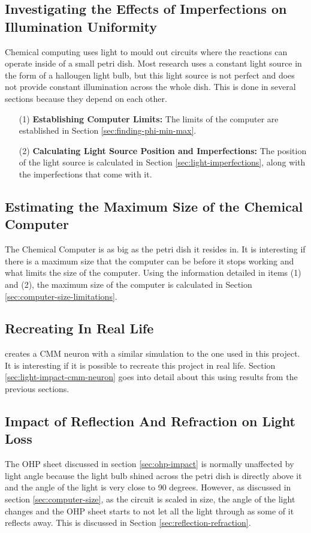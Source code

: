 \subsection{Investigating the Effects of Imperfections on Illumination Uniformity}
Chemical computing uses light to mould out circuits where the reactions can operate inside of a small petri dish. 
Most research  uses a constant light source in the form of a hallougen light bulb, but this light source is not perfect and does not provide constant illumination across the whole dish. 
This is done in several sections because they depend on each other. 
\begin{enumerate}
    \item[(1)] \textbf{Establishing Computer Limits:} The limits of the computer are established in Section \ref{sec:finding-phi-min-max}.
    \item[(2)] \textbf{Calculating Light Source Position and Imperfections:} The position of the light source is calculated in Section \ref{sec:light-imperfections}, along with the imperfections that come with it.
\end{enumerate}

\subsection{Estimating the Maximum Size of the Chemical Computer}
The Chemical Computer is as big as the petri dish it resides in. It is interesting if there is a maximum size that the computer can be before it stops working and 
what limits the size of the computer. 
Using the information detailed in items (1) and (2), the maximum size of the computer is calculated in Section \ref{sec:computer-size-limitations}.

\subsection{Recreating \cite{stovold2017reaction} In Real Life}
\cite{stovold2017reaction} creates a CMM neuron with a similar simulation to the one used in this project. 
It is interesting if it is possible to recreate this project in real life.
Section \ref{sec:light-impact-cmm-neuron} goes into detail about this using results from the previous sections. 

\subsection{Impact of Reflection And Refraction on Light Loss}
The OHP sheet discussed in section \ref{sec:ohp-impact} is normally unaffected by light angle because the light bulb shined across the petri dish is directly above it and the angle of the light is very close to 90 degrees.
However, as discussed in section \ref{sec:computer-size}, as the circuit is scaled in size, the angle of the light changes and the OHP sheet starts to not let all the light through as some of it reflects away.
This is discussed in Section \ref{sec:reflection-refraction}.

